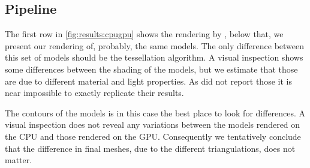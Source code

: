 
\subsection{Pipeline}
\label{s:results:pipeline}
	The first row in \cref{fig:results:cpugpu} shows the rendering by \citeauthor{vlachos2001curved}, below that, we present our rendering of, probably, the same models. The only difference between this set of models should be the tessellation algorithm. A visual inspection shows some differences between the shading of the models, but we estimate that those are due to different material and light properties. As \citeauthor{vlachos2001curved} did not report those it is near impossible to exactly replicate their results. 

	The contours of the models is in this case the best place to look for differences. A visual inspection does not reveal any variations between the models rendered on the CPU and those rendered on the GPU. Consequently we tentatively conclude that the difference in final meshes, due to the different triangulations, does not matter.

	